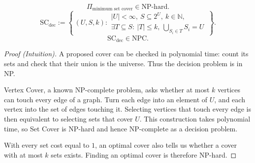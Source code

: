 \documentclass[12pt,a4paper]{article}
\begin{document}
\noindent\begin{minipage}{\linewidth}
\begin{theorem}
\[
\Pi_{\text{minimum set cover}}\in\mathrm{NP\text{-}hard}.
\]
\[
\mathrm{SC}_{\mathrm{dec}}:=\left\{\,(U,S,k):
\begin{array}{l}
|U|<\infty,\ S\subseteq 2^U,\ k\in\mathbb N,\\
\exists T\subseteq S:\ |T|\leq k,\ \displaystyle\bigcup_{S_i\in T}S_i=U
\end{array}\,\right\}.
\]
\[
\mathrm{SC}_{\mathrm{dec}}\in\mathrm{NPC}.
\]
\end{theorem}

\begin{proof}[Proof (Intuition)]
A proposed cover can be checked in polynomial time: count its sets and check
that their union is the universe. Thus the decision problem is in NP.

Vertex Cover, a known NP-complete problem, asks whether at most $k$ vertices
can touch every edge of a graph. Turn each edge into an element of $U$, and
each vertex into the set of edges touching it. Selecting vertices that touch
every edge is then equivalent to selecting sets that cover $U$. This
construction takes polynomial time, so Set Cover is NP-hard and hence
NP-complete as a decision problem.

With every set cost equal to $1$, an optimal cover also tells us whether a
cover with at most $k$ sets exists. Finding an optimal cover is therefore
NP-hard.
\end{proof}
\end{minipage}\par
\end{document}
